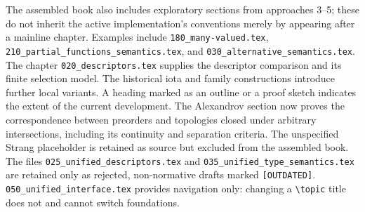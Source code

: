 The assembled book also includes exploratory sections from approaches 3--5;
these do not inherit the active implementation's conventions merely by
appearing after a mainline chapter. Examples include
\texttt{180\_\allowbreak many-valued.tex},
\texttt{210\_\allowbreak partial\_\allowbreak functions\_\allowbreak semantics.tex}, and
\texttt{030\_\allowbreak alternative\_\allowbreak semantics.tex}.
The chapter \texttt{020\_\allowbreak descriptors.tex} supplies the descriptor comparison and
its finite selection model.
The historical iota and family constructions introduce further local variants.
A heading marked as an outline or a proof sketch indicates the extent of the
current development. The Alexandrov section now proves the correspondence
between preorders and topologies closed under arbitrary intersections,
including its continuity and separation criteria. The unspecified Strang
placeholder is retained as source but excluded from the assembled book. The files
\texttt{025\_\allowbreak unified\_\allowbreak descriptors.tex} and
\texttt{035\_\allowbreak unified\_\allowbreak type\_\allowbreak semantics.tex} are retained only as rejected,
non-normative drafts marked \texttt{[OUTDATED]}.
\texttt{050\_\allowbreak unified\_\allowbreak interface.tex} provides navigation only: changing a
\verb|\topic| title does not and cannot switch foundations.



